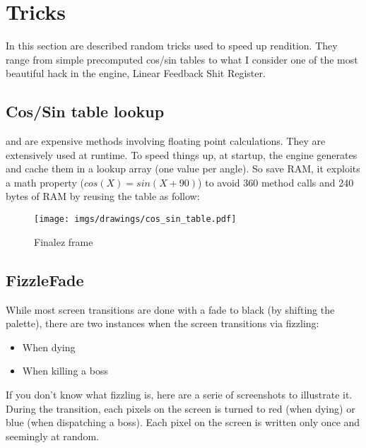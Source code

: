 \section{Tricks}

In this section are described random tricks used to speed up rendition. They range from simple precomputed cos/sin tables to what I consider one of the most beautiful hack in the engine, Linear Feedback Shit Register.




\subsection{Cos/Sin table lookup}
 and  are expensive methods involving floating point calculations. They are extensively used at runtime. To speed things up, at startup, the engine generates and cache them in a lookup array (one value per angle). So save RAM, it exploits a math property ($cos(X) = sin(X + 90)$) to avoid 360  method calls and 240 bytes of RAM by reusing the  table as follow:\\
\par

\begin{minipage}{\textwidth}

\end{minipage}


\begin{figure}[H]
 \centering
  \texttt{[image: imgs/drawings/cos\_sin\_table.pdf]}
 \caption{Finalez frame} 
\end{figure}








\subsection{FizzleFade}
While most screen transitions are done with a fade to black (by shifting the palette), there are two instances when the screen transitions via fizzling:
\begin{itemize}
	\item When dying
	\item When killing a boss
\end{itemize}
If you don't know what fizzling is, here are a serie of screenshots to illustrate it. During the transition, each pixels on the screen is turned to red (when dying) or blue (when dispatching a boss). Each pixel on the screen is written only once and seemingly at random. 



